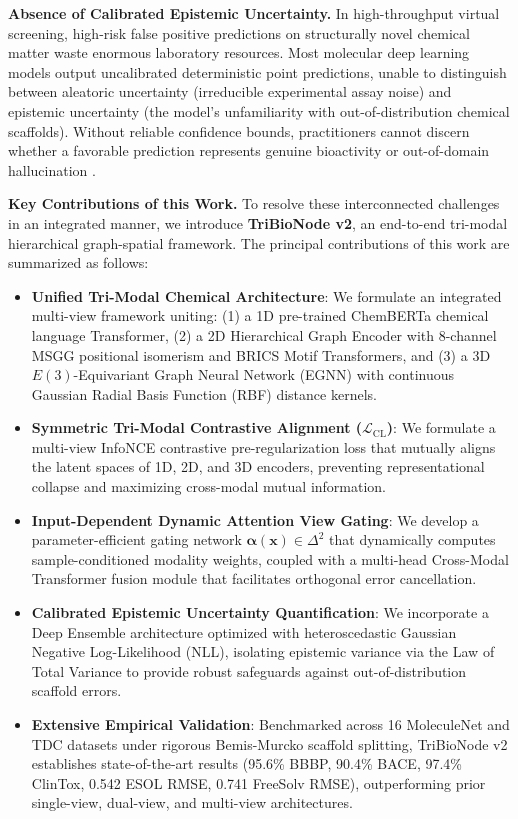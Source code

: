 \documentclass[10pt,twocolumn]{article}
\begin{document}
\noindent\textbf{Absence of Calibrated Epistemic Uncertainty.} In high-throughput virtual screening, high-risk false positive predictions on structurally novel chemical matter waste enormous laboratory resources. Most molecular deep learning models output uncalibrated deterministic point predictions, unable to distinguish between aleatoric uncertainty (irreducible experimental assay noise) and epistemic uncertainty (the model's unfamiliarity with out-of-distribution chemical scaffolds). Without reliable confidence bounds, practitioners cannot discern whether a favorable prediction represents genuine bioactivity or out-of-domain hallucination \cite{soleimany2021image, hirschfeld2020uncertainty}.

\noindent\textbf{Key Contributions of this Work.} To resolve these interconnected challenges in an integrated manner, we introduce \textbf{TriBioNode v2}, an end-to-end tri-modal hierarchical graph-spatial framework. The principal contributions of this work are summarized as follows:
\begin{itemize}
    \item \textbf{Unified Tri-Modal Chemical Architecture}: We formulate an integrated multi-view framework uniting: (1) a 1D pre-trained ChemBERTa chemical language Transformer, (2) a 2D Hierarchical Graph Encoder with 8-channel MSGG positional isomerism and BRICS Motif Transformers, and (3) a 3D $E(3)$-Equivariant Graph Neural Network (EGNN) with continuous Gaussian Radial Basis Function (RBF) distance kernels.
    \item \textbf{Symmetric Tri-Modal Contrastive Alignment ($\mathcal{L}_{\text{CL}}$)}: We formulate a multi-view InfoNCE contrastive pre-regularization loss that mutually aligns the latent spaces of 1D, 2D, and 3D encoders, preventing representational collapse and maximizing cross-modal mutual information.
    \item \textbf{Input-Dependent Dynamic Attention View Gating}: We develop a parameter-efficient gating network $\bm{\alpha}(\mathbf{x}) \in \Delta^2$ that dynamically computes sample-conditioned modality weights, coupled with a multi-head Cross-Modal Transformer fusion module that facilitates orthogonal error cancellation.
    \item \textbf{Calibrated Epistemic Uncertainty Quantification}: We incorporate a Deep Ensemble architecture optimized with heteroscedastic Gaussian Negative Log-Likelihood (NLL), isolating epistemic variance via the Law of Total Variance to provide robust safeguards against out-of-distribution scaffold errors.
    \item \textbf{Extensive Empirical Validation}: Benchmarked across 16 MoleculeNet and TDC datasets under rigorous Bemis-Murcko scaffold splitting, TriBioNode v2 establishes state-of-the-art results (95.6\% BBBP, 90.4\% BACE, 97.4\% ClinTox, 0.542 ESOL RMSE, 0.741 FreeSolv RMSE), outperforming prior single-view, dual-view, and multi-view architectures.
\end{itemize}
\end{document}
